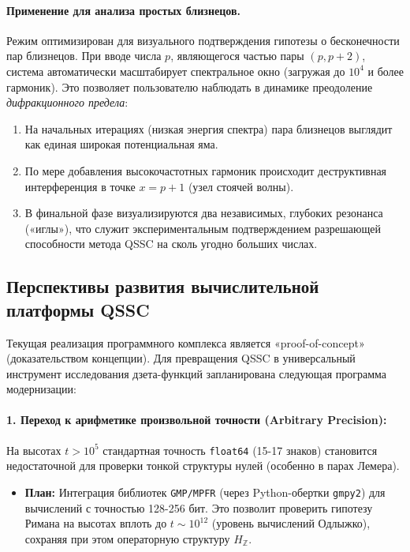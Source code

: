 \documentclass{article}
\numberwithin{equation}{section}
\theoremstyle{plain}
\theoremstyle{definition}
\theoremstyle{remark}
\begin{document}
\paragraph{Применение для анализа простых близнецов.}
Режим оптимизирован для визуального подтверждения гипотезы о бесконечности пар близнецов. При вводе числа $p$, являющегося частью пары $(p, p+2)$, система автоматически масштабирует спектральное окно (загружая до $10^4$ и более гармоник). Это позволяет пользователю наблюдать в динамике преодоление \textit{дифракционного предела}:
\begin{enumerate}
    \item На начальных итерациях (низкая энергия спектра) пара близнецов выглядит как единая широкая потенциальная яма.
    \item По мере добавления высокочастотных гармоник происходит деструктивная интерференция в точке $x = p+1$ (узел стоячей волны).
    \item В финальной фазе визуализируются два независимых, глубоких резонанса («иглы»), что служит экспериментальным подтверждением разрешающей способности метода QSSC на сколь угодно больших числах.
\end{enumerate}

\subsection*{Перспективы развития вычислительной платформы QSSC}

Текущая реализация программного комплекса является «proof-of-concept» (доказательством концепции). Для превращения QSSC в универсальный инструмент исследования дзета-функций запланирована следующая программа модернизации:

\paragraph{1. Переход к арифметике произвольной точности (Arbitrary Precision):}
На высотах $t > 10^5$ стандартная точность \texttt{float64} (15-17 знаков) становится недостаточной для проверки тонкой структуры нулей (особенно в парах Лемера).
\begin{itemize}
    \item \textbf{План:} Интеграция библиотек \texttt{GMP/MPFR} (через Python-обертки \texttt{gmpy2}) для вычислений с точностью 128-256 бит. Это позволит проверить гипотезу Римана на высотах вплоть до $t \sim 10^{12}$ (уровень вычислений Одлыжко), сохраняя при этом операторную структуру $H_{\mathbb{Z}}$.
\end{itemize}
\end{document}
